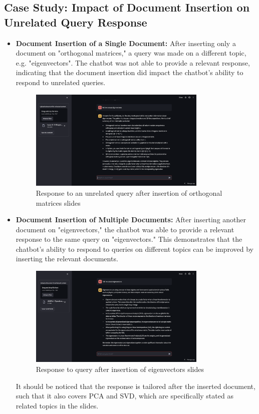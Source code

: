 \subsection{Case Study: Impact of Document Insertion on Unrelated Query Response} \label{unrelated_query}
\begin{itemize}
    \item \textbf{Document Insertion of a Single Document:} After inserting only a document on "orthogonal matrices," a query was made on a different topic, e.g. "eigenvectors". The chatbot was not able to provide a relevant response, indicating that the document insertion did impact the chatbot's ability to respond to unrelated queries.
    \begin{figure}[H]
        \centering
        \includegraphics[width=0.8\textwidth]{figs/eigvectors.png}
        \caption{Response to an unrelated query after insertion of orthogonal matrices slides}
        \label{fig:unrelated_query}
    \end{figure}

    \item \textbf{Document Insertion of Multiple Documents:} After inserting another document on "eigenvectors," the chatbot was able to provide a relevant response to the same query on "eigenvectors." This demonstrates that the chatbot's ability to respond to queries on different topics can be improved by inserting the relevant documents.
    \begin{figure}[H]
        \centering
        \includegraphics[width=0.8\textwidth]{figs/eigvectors2.png}
        \caption{Response to query after insertion of eigenvectors slides}
        \label{fig:unrelated_query2}
    \end{figure}
    It should be noticed that the response is tailored after the inserted document, such that it also covers PCA and SVD, which are specifically stated as related topics in the slides.
\end{itemize}
